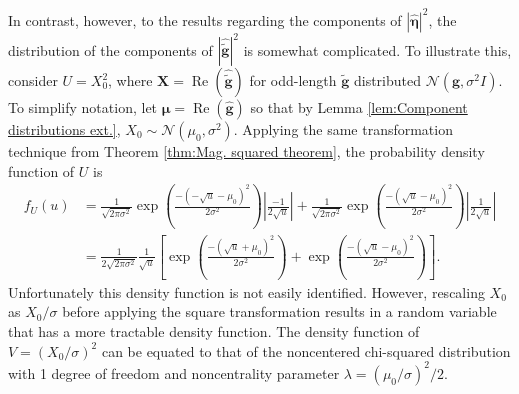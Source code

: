 \documentclass[12pt]{article}
\newcommand{\gVec}{\mathbf{g}}	%
\newcommand{\gnoiseVec}{\widetilde{\mathbf{g}}}	%
\newcommand{\noise}{\eta}	%
\newcommand{\noiseSD}{\sigma}	%
\newcommand{\noiseVec}{\bm{\noise}}	%
\renewcommand{\Re}{\operatorname{Re}}	%
\begin{document}
In contrast, however, to the results regarding the components of $|\widehat{\noiseVec}|^2$, the distribution of the components of $|\widehat{\gnoiseVec}|^2$ is somewhat  complicated. To illustrate this, consider $U = X_0^2$, where $\bm{X} = \Re(\widehat{\gnoiseVec})$ for odd-length $\gnoiseVec$ distributed $\mathcal{N}(\gVec,\noiseSD^2 I)$. To simplify notation, let $\bm{\mu} = \Re(\widehat{\gVec})$ so that by Lemma \ref{lem:Component distributions ext.}, $X_0 \sim \mathcal{N}(\mu_0,\noiseSD^2)$. Applying the same transformation technique from Theorem \ref{thm:Mag. squared theorem}, the probability density function of $U$ is 
\begin{align*}
f_U(u) &= \frac{1}{\sqrt{2\pi\noiseSD^2}}\exp\left(\frac{-(-\sqrt{u} - \mu_0)^2}{2\noiseSD^2}\right)\left|\frac{-1}{2\sqrt{u}}\right| + \frac{1}{\sqrt{2\pi\noiseSD^2}}\exp\left(\frac{-(\sqrt{u} - \mu_0)^2}{2\noiseSD^2}\right)\left|\frac{1}{2\sqrt{u}}\right| \\
&= \frac{1}{2\sqrt{2\pi\noiseSD^2}} \frac{1}{\sqrt{u}} \left[\exp\left(\frac{-(\sqrt{u} + \mu_0)^2}{2\noiseSD^2}\right) + \exp\left(\frac{-(\sqrt{u} - \mu_0)^2}{2\noiseSD^2}\right)\right].
\end{align*}
Unfortunately this density function is not easily identified. However, rescaling $X_0$ as $X_0/\noiseSD$ before applying the square transformation results in a random variable that has a more tractable density function. The density function of $V = (X_0/\noiseSD)^2$ can be equated to that of the noncentered chi-squared distribution with 1 degree of freedom and noncentrality parameter $\lambda = (\mu_0/\noiseSD)^2/2$. 
\end{document}
